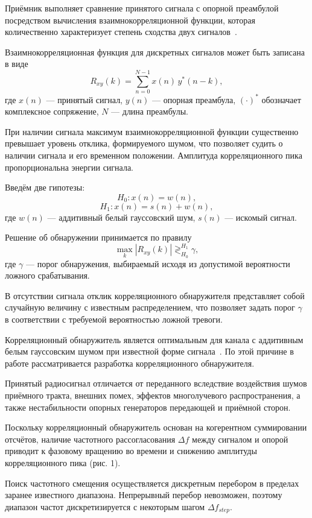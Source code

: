 Приёмник выполняет сравнение принятого сигнала с опорной преамбулой посредством вычисления взаимнокорреляционной функции, которая количественно характеризует степень сходства двух сигналов~\cite{sergienko_dsp}.

Взаимнокорреляционная функция для дискретных сигналов может быть записана в виде
\begin{equation}
	R_{xy}(k) = \sum_{n=0}^{N-1} x(n)\, y^*(n-k),
\end{equation}
где $x(n)$ — принятый сигнал, $y(n)$ — опорная преамбула, $(\cdot)^*$ обозначает комплексное сопряжение, $N$ — длина преамбулы.

При наличии сигнала максимум взаимнокорреляционной функции существенно превышает уровень отклика, формируемого шумом, что позволяет судить о наличии сигнала и его временном положении. Амплитуда корреляционного пика пропорциональна энергии сигнала.

Введём две гипотезы:
\[
H_0: x(n) = w(n),
\]
\[
H_1: x(n) = s(n) + w(n),
\]
где $w(n)$ — аддитивный белый гауссовский шум, $s(n)$ — искомый сигнал.

Решение об обнаружении принимается по правилу
\begin{equation}
	\max_k |R_{xy}(k)| 
	\mathop{\gtrless}_{H_0}^{H_1} \gamma,
\end{equation}
где $\gamma$ — порог обнаружения, выбираемый исходя из допустимой вероятности ложного срабатывания.

В отсутствии сигнала отклик корреляционного обнаружителя представляет собой случайную величину с известным распределением, что позволяет задать порог $\gamma$ в соответствии с требуемой вероятностью ложной тревоги.

Корреляционный обнаружитель является оптимальным для канала с аддитивным белым гауссовским шумом при известной форме сигнала~\cite{black_book}. 
По этой причине в работе рассматривается разработка корреляционного обнаружителя.

Принятый радиосигнал отличается от переданного вследствие воздействия шумов приёмного тракта, внешних помех, эффектов многолучевого распространения, а также нестабильности опорных генераторов передающей и приёмной сторон.

Поскольку корреляционный обнаружитель основан на когерентном суммировании отсчётов, наличие частотного рассогласования $\Delta f$ между сигналом и опорой приводит к фазовому вращению во времени и снижению амплитуды корреляционного пика (рис. 1). 

Поиск частотного смещения осуществляется дискретным перебором в пределах заранее известного диапазона. Непрерывный перебор невозможен, поэтому диапазон частот дискретизируется с некоторым шагом $\Delta f_{step}$.

